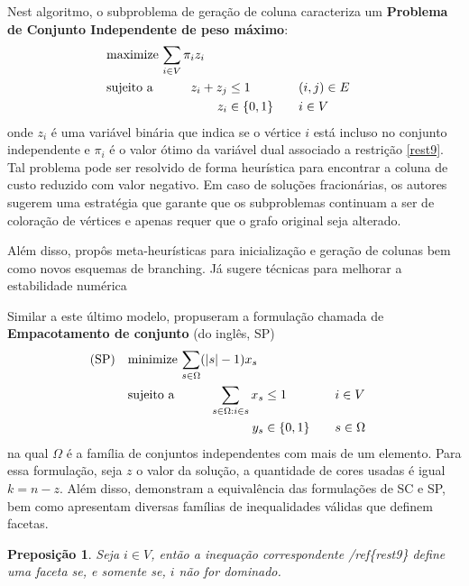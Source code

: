 \documentclass[11pt]{article}
\newtheorem{prep}{Preposição}[section]
\begin{document}
Nest algoritmo, o subproblema de geração de coluna caracteriza um \textbf{Problema de Conjunto Independente de peso máximo}:
\begin{alignat*}{4}
& \omit\rlap{maximize  $\displaystyle \sum_{i \in V} \pi_i z_i$} \\
& \mbox{sujeito a}&& \quad & z_i + z_j &\leq 1 & \quad & (i,j) \in E \\
&                 &&   & z_i       & \in \{0,1\} &    & i \in V
\end{alignat*}
onde \(z_i\) é uma variável binária que indica se o vértice \(i\) está incluso no conjunto independente e \(\pi_i\) é o valor ótimo da variável dual associado a restrição \ref{rest9}.
Tal problema pode ser resolvido de forma heurística para encontrar a coluna de custo reduzido com valor negativo.
Em caso de soluções fracionárias, os autores sugerem uma estratégia  que garante que os subproblemas continuam a ser de coloração de vértices e apenas requer que o grafo original seja alterado.

Além disso, \textcite{Malaguti2011ExactApproachVertex} propôs meta-heurísticas para inicialização e geração de colunas bem como novos esquemas de branching.
Já \textcite{Held2012Maximumweightstable} sugere técnicas para melhorar a estabilidade numérica

Similar a este último modelo, \textcite{Hansen2009Setcoveringpacking} propuseram a formulação chamada de \textbf{Empacotamento de conjunto} (do inglês, SP)
\begin{alignat*}{4}
\mathrm{(SP)} \quad & \omit\rlap{minimize  $\displaystyle \sum_{s \in \Omega} (|s| - 1)x_s$} \\
& \mbox{sujeito a}&& \quad & \sum_{s \in \Omega: i \in s} x_{s}&\leq 1 & \quad & i \in V \\
&                 &&   & y_s       & \in \{0,1\} &    & s \in \Omega
\end{alignat*}
na qual \(\Omega\) é a família de conjuntos independentes com mais de um elemento.
Para essa formulação, seja \(z\) o valor da solução, a quantidade de cores usadas é igual \(k = n - z\).
Além disso, \textcite{Hansen2009Setcoveringpacking} demonstram a equivalência das formulações de SC e SP, bem como apresentam diversas famílias de inequalidades válidas que definem facetas.

\begin{prep}
\textcite{Hansen2009Setcoveringpacking} Seja \(i \in V\), então a inequação correspondente /ref\{rest9\} define uma faceta se, e somente se, \(i\) não for dominado.
\end{prep}
\end{document}
